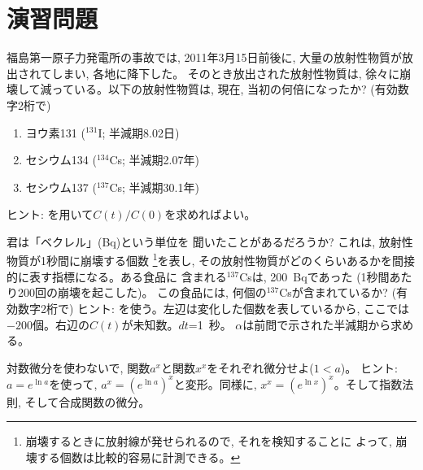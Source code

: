 \section*{演習問題}

\begin{exq}\label{q:funct_nucl_acc} 福島第一原子力発電所の事故では, 
2011年3月15日前後に, 大量の放射性物質が放出されてしまい, 各地に降下した。
そのとき放出された放射性物質は, 徐々に崩壊して減っている。以下の放射性物質は, 
現在, 当初の何倍になったか? (有効数字2桁で)
\begin{enumerate}
\item ヨウ素131 ($^{131}$I; 半減期8.02日)
\item セシウム134 ($^{134}$Cs; 半減期2.07年)
\item セシウム137 ($^{137}$Cs; 半減期30.1年)
\end{enumerate}
{\small ヒント: を用いて$C(t)/C(0)$を求めればよい。}
\end{exq}
\mv

\begin{exq}\label{q:funct_nucl_acc2} 君は「ベクレル」(Bq)という単位を
聞いたことがあるだろうか? これは, 放射性物質が1秒間に崩壊する個数
\footnote{崩壊するときに放射線が発せられるので, それを検知することに
よって, 崩壊する個数は比較的容易に計測できる。}を表し, 
その放射性物質がどのくらいあるかを間接的に表す指標になる。ある食品に
含まれる$^{137}$Csは, 200~Bqであった (1秒間あたり200回の崩壊を起こした)。
この食品には, 何個の$^{137}$Csが含まれているか? (有効数字2桁で) 
{\small ヒント: を使う。左辺は変化した個数を表しているから, 
ここでは$-200$個。右辺の$C(t)$が未知数。$dt$=1~秒。
$\alpha$は前問で示された半減期から求める。}\end{exq}
\mv

\begin{exq}\label{exq:exp_diff_powpow}
対数微分を使わないで, 関数$a^x$と関数$x^x$をそれぞれ微分せよ($1<a$)。
ヒント: $a=e^{\ln a}$を使って, $a^x=(e^{\ln a})^x$と変形。同様に, 
$x^x=(e^{\ln x})^x$。そして指数法則, そして合成関数の微分。\end{exq}
\mv


